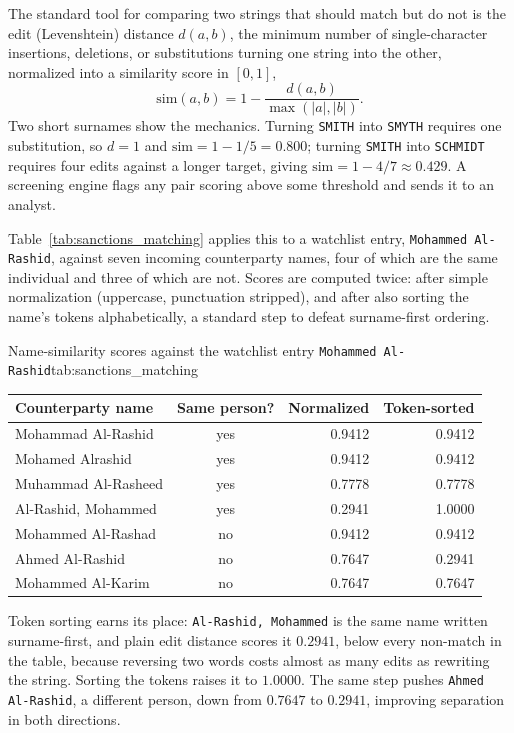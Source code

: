 \documentclass[../ai_in_finance]{subfiles}
\begin{document}
The standard tool for comparing two strings that should match but do not is the edit (Levenshtein) distance $d(a,b)$, the minimum number of single-character insertions, deletions, or substitutions turning one string into the other, normalized into a similarity score in $[0,1]$,
\begin{equation}
\text{sim}(a,b) = 1 - \frac{d(a,b)}{\max(|a|,|b|)}.
\label{eq:fraud-name-similarity}
\end{equation}
Two short surnames show the mechanics. Turning \texttt{SMITH} into \texttt{SMYTH} requires one substitution, so $d=1$ and $\text{sim} = 1 - 1/5 = 0.800$; turning \texttt{SMITH} into \texttt{SCHMIDT} requires four edits against a longer target, giving $\text{sim} = 1 - 4/7 \approx 0.429$. A screening engine flags any pair scoring above some threshold and sends it to an analyst.

Table~\ref{tab:sanctions_matching} applies this to a watchlist entry, \texttt{Mohammed Al-Rashid}, against seven incoming counterparty names, four of which are the same individual and three of which are not. Scores are computed twice: after simple normalization (uppercase, punctuation stripped), and after also sorting the name's tokens alphabetically, a standard step to defeat surname-first ordering.

\begin{booktable}[htbp]{Name-similarity scores against the watchlist entry \texttt{Mohammed Al-Rashid}}{tab:sanctions_matching}
\begin{tabular}{lcrr}
\toprule
Counterparty name & Same person? & Normalized & Token-sorted \\
\midrule
Mohammad Al-Rashid  & yes & 0.9412 & 0.9412 \\
Mohamed Alrashid    & yes & 0.9412 & 0.9412 \\
Muhammad Al-Rasheed & yes & 0.7778 & 0.7778 \\
Al-Rashid, Mohammed & yes & 0.2941 & 1.0000 \\
Mohammed Al-Rashad  & no  & 0.9412 & 0.9412 \\
Ahmed Al-Rashid     & no  & 0.7647 & 0.2941 \\
Mohammed Al-Karim   & no  & 0.7647 & 0.7647 \\
\bottomrule
\end{tabular}
\end{booktable}

Token sorting earns its place: \texttt{Al-Rashid, Mohammed} is the same name written surname-first, and plain edit distance scores it $0.2941$, below every non-match in the table, because reversing two words costs almost as many edits as rewriting the string. Sorting the tokens raises it to $1.0000$. The same step pushes \texttt{Ahmed Al-Rashid}, a different person, down from $0.7647$ to $0.2941$, improving separation in both directions.
\end{document}
